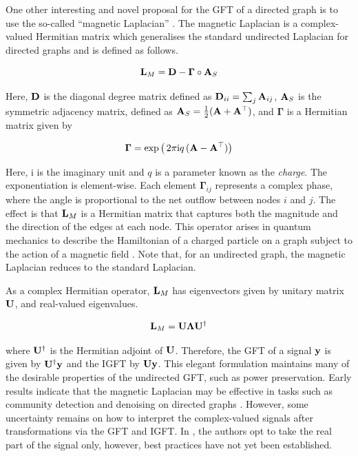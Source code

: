 One other interesting and novel proposal for the GFT of a directed graph is to use the so-called ``magnetic Laplacian'' \citep{DeResende2020, Zhang2021}. The magnetic Laplacian is a complex-valued Hermitian matrix which generalises the standard undirected Laplacian for directed graphs and is defined as follows. 

\begin{equation}
    \mathbf{L}_M = \mathbf{D} - \boldsymbol{\Gamma} \circ \mathbf{A}_S
\end{equation}

Here, $\mathbf{D}$ is the diagonal degree matrix defined as $\mathbf{D}_{ii} = \sum_{j} \mathbf{A}_{ij}$, $\mathbf{A}_S$ is the symmetric adjacency matrix, defined as $\mathbf{A}_S = \frac{1}{2} (\mathbf{A} + \mathbf{A}^\top)$, and $\boldsymbol{\Gamma}$ is a Hermitian matrix given by 

\begin{equation}
    \boldsymbol{\Gamma} = \exp\big( \,2 \pi \text{i} q \, (\mathbf{A} - \mathbf{A}^\top)\big)
\end{equation}

Here, i is the imaginary unit and $q$ is a parameter known as the \textit{charge}. The exponentiation is element-wise. Each element $\boldsymbol{\Gamma}_{ij}$ represents a complex phase, where the angle is proportional to the net outflow between nodes $i$ and $j$. The effect is that $\mathbf{L}_M$ is a Hermitian matrix that captures both the magnitude and the direction of the edges at each node. This operator arises in quantum mechanics to describe the Hamiltonian of a charged particle on a graph subject to the action of a magnetic field \citep{Shubin1994}. Note that, for an undirected graph, the magnetic Laplacian reduces to the standard Laplacian. 

As a complex Hermitian operator, $\mathbf{L}_M$ has eigenvectors given by unitary matrix $\mathbf{U}$, and real-valued eigenvalues. 

\begin{equation}
    \mathbf{L}_M = \mathbf{U} \mathbf{\Lambda} \mathbf{U}^\dagger
\end{equation}

where $\mathbf{U}^\dagger$ is the Hermitian adjoint of $\mathbf{U}$. Therefore, the GFT of a signal $\mathbf{y}$ is given by $\mathbf{U}^\dagger \mathbf{y}$ and the IGFT by $\mathbf{U}\mathbf{y}$. This elegant formulation maintains many of the desirable properties of the undirected GFT, such as power preservation. Early results indicate that the magnetic Laplacian may be effective in tasks such as community detection and denoising on directed graphs \citep{Furutani2020, Fanuel2017}. However, some uncertainty remains on how to interpret the complex-valued signals after transformations via the GFT and IGFT. In \cite{Furutani2020}, the authors opt to take the real part of the signal only, however, best practices have not yet been established. 

